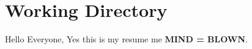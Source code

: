 \documentclass{ResumeClass}
\begin{document}
\section{Working Directory}
Hello Everyone, Yes this is my resume me \textbf{MIND = BLOWN}.
\end{document}
